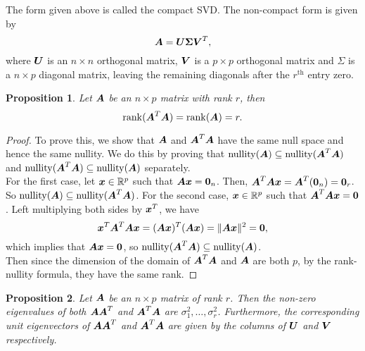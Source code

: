 \documentclass[12pt]{article}
\newtheorem{prop}{Proposition}[section]
\DeclareMathOperator{\rank}{rank}
\DeclareMathOperator{\nul}{nullity}
\newcommand{\Sg}{\Sigma}
\begin{document}
	The form given above is called the compact SVD. The non-compact form is given by
	$$\bmA=\bmU\boldsymbol{\Sg}\bmV^T,$$
	where $\boldsymbol{U}$ is an $n\times n$ orthogonal matrix, $\boldsymbol{V}$ is a $p\times p$ orthogonal matrix and $\Sg$ is a $n\times p$ diagonal matrix, leaving the remaining diagonals after the $r^{\text{th}}$ entry zero.

	\begin{prop}
		Let $\boldsymbol{A}$ be an $n\times p$ matrix with rank $r$, then 
		$$\rank(\bmA^T\bmA)=\rank(\bmA)=r.$$
	\end{prop}
	
	\begin{proof}
		To prove this, we show that $\boldsymbol{A}$ and $\boldsymbol{A}^T\boldsymbol{A}$ have the same null space and hence the same nullity. We do this by proving that $\nul(\bmA)\subseteq\nul(\bmA^T\bmA)$ and $\nul(\bmA^T\bmA)\subseteq\nul(\bmA)$ separately.\\
		
		For the first case, let $\bmx\in\RR^p$ such that $\boldsymbol{A}\boldsymbol{x}=\textbf{0}_n$. Then, $\boldsymbol{A}^T\boldsymbol{A}\boldsymbol{x}=\boldsymbol{A}^T(\textbf{0}_n)=\textbf{0}_r$. So $\nul(\bmA)\subseteq\nul(\bmA^T\bmA)$. For the second case, $\bmx\in\RR^p$ such that $\boldsymbol{A}^T\boldsymbol{A}\boldsymbol{x}=\textbf{0}$. Left multiplying both sides by $\boldsymbol{x}^T$, we have
		$$\boldsymbol{x}^T\boldsymbol{A}^T\boldsymbol{A}\boldsymbol{x}=(\boldsymbol{A}\boldsymbol{x})^T(\boldsymbol{A}\boldsymbol{x})=\|\boldsymbol{A}\boldsymbol{x}\|^2=\textbf{0},$$
		which implies that $\boldsymbol{A}\boldsymbol{x}=\textbf{0}$, so $\nul(\bmA^T\bmA)\subseteq\nul(\bmA)$.\\

		Then since the dimension of the domain of $\boldsymbol{A}^T\boldsymbol{A}$ and $\boldsymbol{A}$ are both $p$, by the rank-nullity formula, they have the same rank.
	\end{proof}
	
	\begin{prop}\label{prop1}
		Let $\boldsymbol{A}$ be an $n\times p$ matrix of rank $r$. Then the non-zero eigenvalues of both $\boldsymbol{A}\boldsymbol{A}^T$ and $\boldsymbol{A}^T\boldsymbol{A}$ are $\sigma_1^2,\ldots,\sigma_r^2$.
		Furthermore, the corresponding unit eigenvectors of $\boldsymbol{A}\boldsymbol{A}^T$ and $\boldsymbol{A}^T\boldsymbol{A}$ are given by the columns of $\boldsymbol{U}$ and $\boldsymbol{V}$ respectively.
	\end{prop}
	
\end{document}
